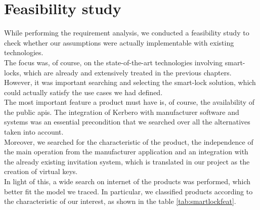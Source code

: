 \section{Feasibility study}
While performing the requirement analysis, we conducted a feasibility study to check whether our assumptions were actually implementable with existing technologies. 
\\ The focus was, of course, on the state-of-the-art technologies involving smart-locks, which are already and extensively treated in the previous chapters. However, it was important searching and selecting the smart-lock solution, which could actually satisfy the use cases we had defined. 
\\ The most important feature a product must have is, of course, the availability of the public \acrshort{api}s. The integration of Kerbero with manufacturer software and systems was an essential precondition that we searched over all the alternatives taken into account. 
\\ Moreover, we searched for the characteristic of the product, the independence of the main operation from the manufacturer application and an integration with the already existing invitation system, which is translated in our project as the creation of virtual keys. 
\\ In light of this, a wide search on internet of the products was performed, which better fit the model we traced. In particular, we classified products according to the characteristic of our interest, as shown in the table \ref{tab:smartlockfeat}.

